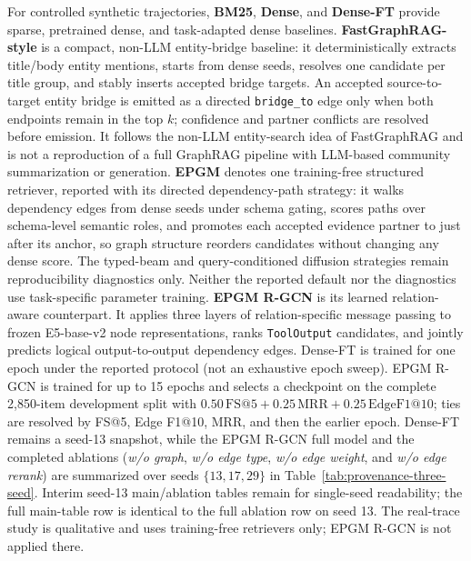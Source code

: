 For controlled synthetic trajectories, \textbf{BM25}, \textbf{Dense}, and
\textbf{Dense-FT} provide sparse, pretrained dense, and task-adapted
dense baselines. \textbf{FastGraphRAG-style} is a compact, non-LLM
entity-bridge baseline: it deterministically extracts title/body entity
mentions, starts from dense seeds, resolves one candidate per title group,
and stably inserts accepted bridge targets. An accepted source-to-target
entity bridge is emitted as a directed \texttt{bridge\_to} edge only when
both endpoints remain in the top $k$; confidence and partner conflicts are
resolved before emission. It follows the non-LLM entity-search idea of
FastGraphRAG and is not a reproduction of a full GraphRAG pipeline with
LLM-based community summarization or generation.
\textbf{EPGM} denotes one training-free structured retriever, reported with
its directed dependency-path strategy: it walks dependency edges from dense
seeds under schema gating, scores paths over schema-level semantic roles, and
promotes each accepted evidence partner to just after its anchor, so graph
structure reorders candidates without changing any dense score. The typed-beam
and query-conditioned diffusion strategies remain reproducibility
diagnostics only. Neither
the reported default nor the diagnostics use task-specific parameter
training. \textbf{EPGM R-GCN} is its learned
relation-aware counterpart. It applies three layers of relation-specific
message passing to frozen E5-base-v2 node representations, ranks
\texttt{ToolOutput} candidates, and jointly predicts logical
output-to-output dependency edges. Dense-FT is trained for one epoch under the reported protocol (not an exhaustive epoch sweep).
EPGM R-GCN is trained for up to 15 epochs and selects a checkpoint on the
complete 2,850-item development split with
$0.50\,\mathrm{FS@5}+0.25\,\mathrm{MRR}+0.25\,\mathrm{EdgeF1@10}$;
ties are resolved by FS@5, Edge F1@10, MRR, and then the earlier epoch.
Dense-FT remains a seed-13 snapshot, while the EPGM R-GCN full model and
the completed ablations (\emph{w/o graph}, \emph{w/o edge type},
\emph{w/o edge weight}, and \emph{w/o edge rerank}) are summarized over
seeds $\{13,17,29\}$ in Table~\ref{tab:provenance-three-seed}. Interim
seed-13 main/ablation tables remain for single-seed readability; the full
main-table row is identical to the full ablation row on seed 13. The real-trace
study is qualitative and uses training-free retrievers only; EPGM R-GCN is
not applied there.

